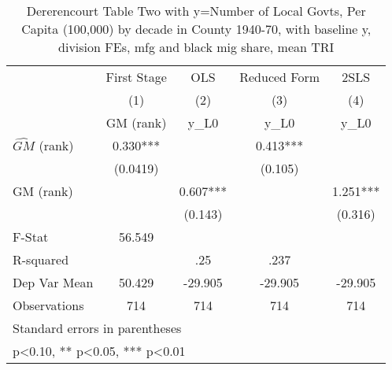 \begin{table}[htbp]\centering
\def\sym#1{\ifmmode^{#1}\else\(^{#1}\)\fi}
\caption{Dererencourt Table Two with y=Number of Local Govts, Per Capita (100,000) by decade in County 1940-70, with baseline y, division FEs, mfg and black mig share, mean TRI}
\begin{tabular}{l*{4}{c}}
\toprule
                    & First Stage   &         OLS   &Reduced Form   &        2SLS   \\
                    &\multicolumn{1}{c}{(1)}&\multicolumn{1}{c}{(2)}&\multicolumn{1}{c}{(3)}&\multicolumn{1}{c}{(4)}\\
                    &\multicolumn{1}{c}{GM  (rank)}&\multicolumn{1}{c}{y\_L0}&\multicolumn{1}{c}{y\_L0}&\multicolumn{1}{c}{y\_L0}\\
\midrule
$\hat{GM}$ (rank)   &       0.330***&               &       0.413***&               \\
                    &    (0.0419)   &               &     (0.105)   &               \\
\addlinespace
GM  (rank)          &               &       0.607***&               &       1.251***\\
                    &               &     (0.143)   &               &     (0.316)   \\
\midrule
F-Stat              &      56.549   &               &               &               \\
R-squared           &               &         .25   &        .237   &               \\
Dep Var Mean        &      50.429   &     -29.905   &     -29.905   &     -29.905   \\
Observations        &         714   &         714   &         714   &         714   \\
\bottomrule
\multicolumn{5}{l}{\footnotesize Standard errors in parentheses}\\
\multicolumn{5}{l}{\footnotesize * p<0.10, ** p<0.05, *** p<0.01}\\
\end{tabular}
\end{table}
